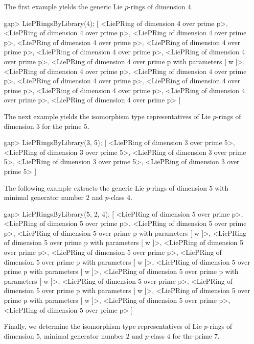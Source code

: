 The first example yields the generic Lie $p$-rings of dimension $4$.

\beginexample
gap> LiePRingsByLibrary(4);
[ <LiePRing of dimension 4 over prime p>, 
  <LiePRing of dimension 4 over prime p>, 
  <LiePRing of dimension 4 over prime p>, 
  <LiePRing of dimension 4 over prime p>, 
  <LiePRing of dimension 4 over prime p>, 
  <LiePRing of dimension 4 over prime p>, 
  <LiePRing of dimension 4 over prime p>, 
  <LiePRing of dimension 4 over prime p with parameters [ w ]>, 
  <LiePRing of dimension 4 over prime p>, 
  <LiePRing of dimension 4 over prime p>, 
  <LiePRing of dimension 4 over prime p>, 
  <LiePRing of dimension 4 over prime p>, 
  <LiePRing of dimension 4 over prime p>, 
  <LiePRing of dimension 4 over prime p>, 
  <LiePRing of dimension 4 over prime p> ]
\endexample

The next example yields the isomorphism type representatives of Lie 
$p$-rings of dimension $3$ for the prime $5$.

\beginexample
gap> LiePRingsByLibrary(3, 5);
[ <LiePRing of dimension 3 over prime 5>, 
  <LiePRing of dimension 3 over prime 5>, 
  <LiePRing of dimension 3 over prime 5>, 
  <LiePRing of dimension 3 over prime 5>, 
  <LiePRing of dimension 3 over prime 5> ]
\endexample

The following example extracts the generic Lie $p$-rings of dimension
$5$ with minimal generator number $2$ and $p$-class $4$.

\beginexample
gap> LiePRingsByLibrary(5, 2, 4);
[ <LiePRing of dimension 5 over prime p>, 
  <LiePRing of dimension 5 over prime p>, 
  <LiePRing of dimension 5 over prime p>, 
  <LiePRing of dimension 5 over prime p with parameters [ w ]>, 
  <LiePRing of dimension 5 over prime p with parameters [ w ]>, 
  <LiePRing of dimension 5 over prime p>, 
  <LiePRing of dimension 5 over prime p>, 
  <LiePRing of dimension 5 over prime p with parameters [ w ]>, 
  <LiePRing of dimension 5 over prime p with parameters [ w ]>, 
  <LiePRing of dimension 5 over prime p with parameters [ w ]>, 
  <LiePRing of dimension 5 over prime p>, 
  <LiePRing of dimension 5 over prime p with parameters [ w ]>, 
  <LiePRing of dimension 5 over prime p with parameters [ w ]>, 
  <LiePRing of dimension 5 over prime p>, 
  <LiePRing of dimension 5 over prime p> ]
\endexample

Finally, we determine the isomorphism type representatives of Lie
$p$-rings of dimension $5$, minimal generator number $2$ and $p$-class
$4$ for the prime $7$.

